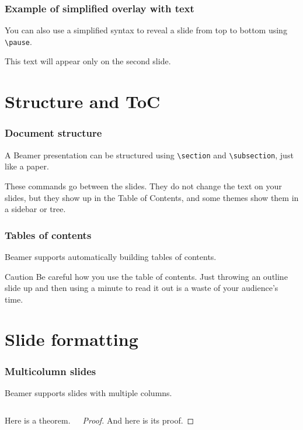 \documentclass{beamer}
\begin{document}
\begin{frame}[fragile]
  \frametitle{Example of simplified overlay with text}
  You can also use a simplified syntax to reveal a slide from top to bottom using \verb|\pause|.

  \pause

  This text will appear only on the second slide.
\end{frame}

\section{Structure and ToC}
\begin{frame}[fragile]
  \frametitle{Document structure}
  A Beamer presentation can be structured using \verb|\section| and \verb|\subsection|, just like a paper.

  These commands go \alert{between} the slides.
  They do not change the text on your slides, but they show up in the Table of Contents, and some themes show them in a sidebar or tree.
\end{frame}

\begin{frame}
  \frametitle{Tables of contents}
  Beamer supports automatically building tables of contents.

  \begin{alertblock}{Caution}
    Be careful how you use the table of contents.
    Just throwing an outline slide up and then using a minute to read it out is a waste of your audience's time.
  \end{alertblock}
\end{frame}

\section{Slide formatting}
\begin{frame}
  \frametitle{Multicolumn slides}
  Beamer supports slides with multiple columns.

  \begin{columns}
    \begin{theorem}
      Here is a theorem.
    \end{theorem}

    \begin{proof}
      And here is its proof.
    \end{proof}
  \end{columns}
\end{frame}
\end{document}
